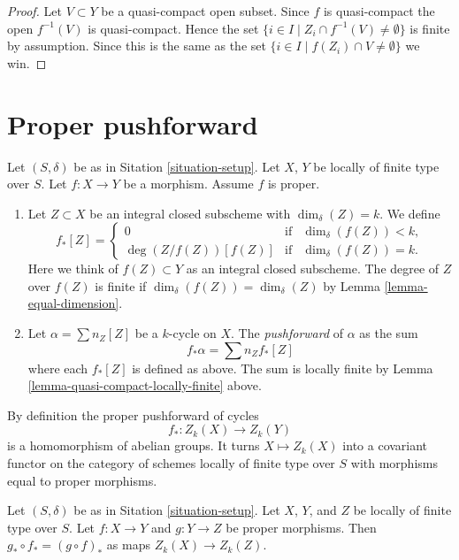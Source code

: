 \begin{proof}
Let $V \subset Y$ be a quasi-compact open subset.
Since $f$ is quasi-compact the open $f^{-1}(V)$ is
quasi-compact. Hence the set
$\{i \in I \mid Z_i \cap f^{-1}(V) \not = \emptyset \}$
is finite by assumption. Since this is the same
as the set
$\{i \in I \mid f(Z_i) \cap V \not = \emptyset \}$
we win.
\end{proof}









\section{Proper pushforward}
\label{section-proper-pushforward}

\begin{definition}
\label{definition-proper-pushforward}
Let $(S, \delta)$ be as in Sitation \ref{situation-setup}.
Let $X$, $Y$ be locally of finite type over $S$.
Let $f : X \to Y$ be a morphism.
Assume $f$ is proper.
\begin{enumerate}
\item Let $Z \subset X$ be an integral closed subscheme
with $\dim_\delta(Z) = k$. We define
$$
f_*[Z] =
\left\{
\begin{matrix}
0 & \text{if} & \dim_\delta(f(Z))< k, \\
\deg(Z/f(Z)) [f(Z)] & \text{if} & \dim_\delta(f(Z)) = k.
\end{matrix}
\right.
$$
Here we think of $f(Z) \subset Y$ as an integral closed subscheme.
The degree of $Z$ over $f(Z)$ is finite if
$\dim_\delta(f(Z)) = \dim_\delta(Z)$
by Lemma \ref{lemma-equal-dimension}.
\item Let $\alpha = \sum n_Z [Z]$ be a $k$-cycle on $X$. The
{\it pushforward} of $\alpha$ as the sum
$$
f_* \alpha = \sum n_Z f_*[Z]
$$
where each $f_*[Z]$ is defined as above. The sum is locally finite
by Lemma \ref{lemma-quasi-compact-locally-finite} above.
\end{enumerate}
\end{definition}

\noindent
By definition the proper pushforward of cycles
$$
f_* : Z_k(X) \longrightarrow Z_k(Y)
$$
is a homomorphism of abelian groups. It turns $X \mapsto Z_k(X)$
into a covariant functor on the category of schemes locally of
finite type over $S$ with morphisms equal to proper morphisms.

\begin{lemma}
\label{lemma-compose-pushforward}
Let $(S, \delta)$ be as in Sitation \ref{situation-setup}.
Let $X$, $Y$, and $Z$ be locally of finite type over $S$.
Let $f : X \to Y$ and $g : Y \to Z$ be proper morphisms.
Then $g_* \circ f_* = (g \circ f)_*$ as maps $Z_k(X) \to Z_k(Z)$.
\end{lemma}

